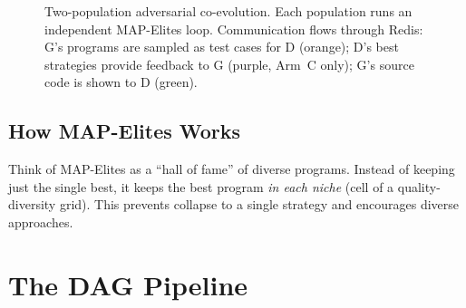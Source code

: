 \documentclass[11pt,a4paper]{article}
\begin{document}
\begin{figure}[H]
\caption{Two-population adversarial co-evolution. Each population runs an independent MAP-Elites loop. Communication flows through Redis: G's programs are sampled as test cases for D (orange); D's best strategies provide feedback to G (purple, Arm~C only); G's source code is shown to D (green).}
\label{fig:architecture}
\end{figure}

\subsection{How MAP-Elites Works}

\begin{eli5box}
Think of MAP-Elites as a ``hall of fame'' of diverse programs.  Instead of keeping just the single best, it keeps the best program \emph{in each niche} (cell of a quality-diversity grid).  This prevents collapse to a single strategy and encourages diverse approaches.
\end{eli5box}

\begin{algorithm}[H]
\SetAlgoLined\DontPrintSemicolon
\caption{MAP-Elites Evolution Loop (per population)}
\label{alg:mapelites}
\end{algorithm}

\section{The DAG Pipeline}
\end{document}

